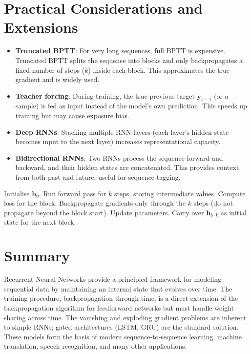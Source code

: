 \documentclass{tufte-handout}
\begin{document}
\section{Practical Considerations and Extensions}

\begin{itemize}
    \item \textbf{Truncated BPTT}: For very long sequences, full BPTT is expensive. Truncated BPTT splits the sequence into blocks and only backpropagates a fixed number of steps ($k$) inside each block. This approximates the true gradient and is widely used.
    \item \textbf{Teacher forcing}: During training, the true previous target $\mathbf{y}_{t-1}$ (or a sample) is fed as input instead of the model’s own prediction. This speeds up training but may cause exposure bias.
    \item \textbf{Deep RNNs}: Stacking multiple RNN layers (each layer’s hidden state becomes input to the next layer) increases representational capacity.
    \item \textbf{Bidirectional RNNs}: Two RNNs process the sequence forward and backward, and their hidden states are concatenated. This provides context from both past and future, useful for sequence tagging.
\end{itemize}

\begin{algorithm}[h]
    \caption{Truncated BPTT (with block size $k$)}
    \begin{algorithmic}[1]
        \State Initialise $\mathbf{h}_0$.
            \State Run forward pass for $k$ steps, storing intermediate values.
            \State Compute loss for the block.
            \State Backpropagate gradients only through the $k$ steps (do not propagate beyond the block start).
            \State Update parameters.
            \State Carry over $\mathbf{h}_{b \cdot k}$ as initial state for the next block.
        \EndFor
    \end{algorithmic}
\end{algorithm}

\section{Summary}

Recurrent Neural Networks provide a principled framework for modeling sequential data by maintaining an internal state that evolves over time. The training procedure, backpropagation through time, is a direct extension of the backpropagation algorithm for feedforward networks but must handle weight sharing across time. The vanishing and exploding gradient problems are inherent to simple RNNs; gated architectures (LSTM, GRU) are the standard solution. These models form the basis of modern sequence‑to‑sequence learning, machine translation, speech recognition, and many other applications.
\end{document}
